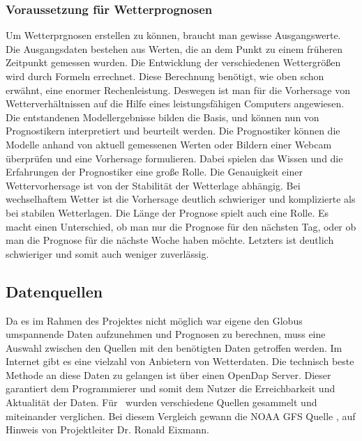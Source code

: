 \subsubsection{Voraussetzung für Wetterprognosen} %
Um Wetterprgnosen erstellen zu können, braucht man gewisse Ausgangswerte.
Die Ausgangsdaten bestehen aus Werten,
die an dem Punkt zu einem früheren Zeitpunkt gemessen wurden.
Die Entwicklung der verschiedenen Wettergrößen wird durch Formeln errechnet.
Diese Berechnung benötigt, wie oben schon erwähnt, eine enormer Rechenleistung.
Deswegen ist man für die Vorhersage von Wetterverhältnissen auf
die Hilfe eines leistungsfähigen Computers angewiesen.
Die entstandenen Modellergebnisse bilden die Basis, und können nun
von Prognostikern interpretiert und beurteilt werden.
Die Prognostiker können die Modelle anhand von aktuell gemessenen Werten
oder Bildern einer Webcam überprüfen und eine Vorhersage formulieren.
Dabei spielen das Wissen und die Erfahrungen der Prognostiker eine große Rolle.
Die Genauigkeit einer Wettervorhersage ist von der Stabilität der Wetterlage abhängig.
Bei wechselhaftem Wetter ist die Vorhersage deutlich schwieriger
und komplizierte als bei stabilen Wetterlagen.
Die Länge der Prognose spielt auch eine Rolle.
Es macht einen Unterschied,
ob man nur die Prognose für den nächsten Tag,
oder ob man die Prognose für die nächste Woche haben möchte.
Letzters ist deutlich schwieriger und somit auch weniger zuverlässig.

\subsection{Datenquellen} %
Da es im Rahmen des Projektes nicht möglich war
eigene den Globus umspannende Daten aufzunehmen und Prognosen zu berechnen,
muss eine Auswahl zwischen den Quellen mit den benötigten Daten getroffen werden.
Im Internet gibt es eine vielzahl von Anbietern von Wetterdaten.
Die technisch beste Methode an diese Daten zu gelangen ist über einen OpenDap Server.
Dieser garantiert dem Programmierer und somit dem Nutzer
die Erreichbarkeit und Aktualität der Daten.
Für \vs\ wurden verschiedene Quellen gesammelt und miteinander verglichen.
Bei diesem Vergleich
gewann die NOAA GFS Quelle \cite{noaa} , auf Hinweis von Projektleiter Dr. Ronald Eixmann.

